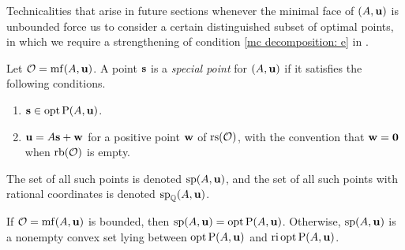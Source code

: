 \documentclass[11pt]{amsart}
\begin{document}
Technicalities that arise in future sections whenever the minimal face of $(A, \mathbf{u})$ is unbounded force us to consider a certain distinguished subset of optimal points, in which we require a strengthening of condition \eqref{mc decomposition: e} in .

\begin{definition}
   \label{mc: D}
   Let $\mathcal{O} = \operatorname{mf}(A, \mathbf{u})$.
   A point $\mathbf{s}$ is a \emph{special point} for $(A, \mathbf{u})$ if it satisfies the following conditions.
\begin{enumerate}
\item $\mathbf{s} \in \operatorname{opt} \mathrm{P}(A, \mathbf{u})$.
\item $\mathbf{u} = A \mathbf{s} + \mathbf{w}$ for a positive point $\mathbf{w}$ of $\operatorname{rs}(\mathcal{O})$, with the convention that $\mathbf{w}=\mathbf{0}$ when $\operatorname{rb}(\mathcal{O})$ is empty.
\end{enumerate}
The set of all such points is denoted $\operatorname{sp}(A, \mathbf{u})$, and the set of all such points with rational coordinates is denoted $\operatorname{sp}_{\mathbb{Q}}(A, \mathbf{u})$.
\end{definition}

\begin{proposition}
   \label{opt versus mc: P}
   If $\mathcal{O} = \operatorname{mf}(A, \mathbf{u})$ is bounded, then $\operatorname{sp}(A, \mathbf{u}) = \operatorname{opt} \mathrm{P}(A, \mathbf{u})$.  Otherwise,  $\operatorname{sp}(A, \mathbf{u})$ is a nonempty convex set lying between $\operatorname{opt} \mathrm{P}(A, \mathbf{u})$ and $\operatorname{ri} \operatorname{opt} \mathrm{P}(A, \mathbf{u})$.
\end{proposition}
\end{document}

